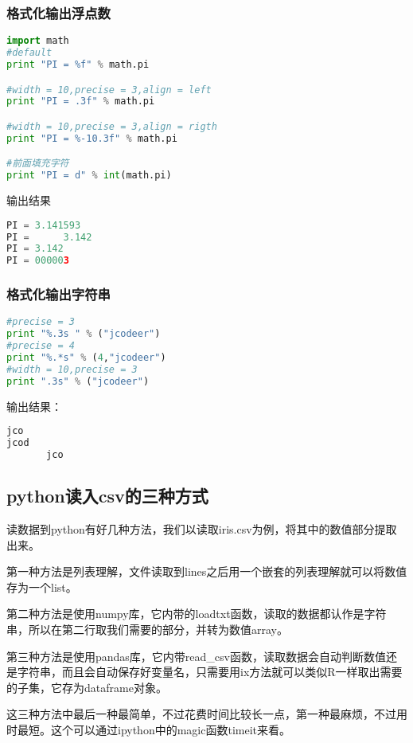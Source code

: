 \subsubsection{格式化输出浮点数}
 \begin{lstlisting}[language=Python]
import math
#default
print "PI = %f" % math.pi

#width = 10,precise = 3,align = left
print "PI = .3f" % math.pi

#width = 10,precise = 3,align = rigth
print "PI = %-10.3f" % math.pi

#前面填充字符
print "PI = d" % int(math.pi)
  \end{lstlisting}
输出结果
 \begin{lstlisting}[language=Python]
PI = 3.141593
PI =      3.142
PI = 3.142
PI = 000003
  \end{lstlisting}


\subsubsection{格式化输出字符串}
 \begin{lstlisting}[language=Python]
#precise = 3
print "%.3s " % ("jcodeer")
#precise = 4
print "%.*s" % (4,"jcodeer")
#width = 10,precise = 3
print ".3s" % ("jcodeer")
  \end{lstlisting}
输出结果：
 \begin{lstlisting}[language=Python]
jco
jcod
       jco
  \end{lstlisting}



\subsection{python读入csv的三种方式}
读数据到python有好几种方法，我们以读取iris.csv为例，将其中的数值部分提取出来。

第一种方法是列表理解，文件读取到lines之后用一个嵌套的列表理解就可以将数值存为一个list。

第二种方法是使用numpy库，它内带的loadtxt函数，读取的数据都认作是字符串，所以在第二行取我们需要的部分，并转为数值array。

第三种方法是使用pandas库，它内带read\_csv函数，读取数据会自动判断数值还是字符串，而且会自动保存好变量名，只需要用ix方法就可以类似R一样取出需要的子集，它存为dataframe对象。

这三种方法中最后一种最简单，不过花费时间比较长一点，第一种最麻烦，不过用时最短。这个可以通过ipython中的magic函数timeit来看。











